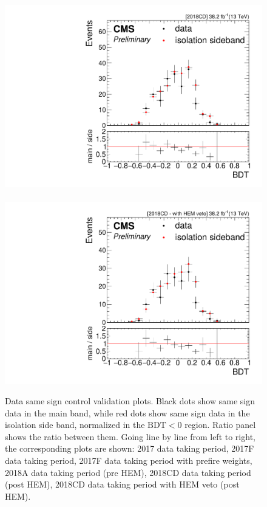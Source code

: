 \begin{figure}[!htb]
\includegraphics[width=0.48\linewidth]{plots/dilepton_muons_data_isocr_no_retag_CorrJetNoMultIso10_06_invmass_same_sign_2018CD/none_dilepBDTCorrJetNoMultIso10Dr0.6.pdf} \,
\includegraphics[width=0.48\linewidth]{plots/dilepton_muons_data_isocr_no_retag_CorrJetNoMultIso10_06_invmass_same_sign_2018CD_hem_veto/hem_ejm_dilepBDTCorrJetNoMultIso10Dr0.6.pdf} \\

\caption[Data same sign control validation plots]{Data same sign control validation plots. Black dots show same sign data in the main band, while red dots show same sign data in the isolation side band, normalized in the $\text{BDT}<0$ region. Ratio panel shows the ratio between them. Going line by line from left to right, the corresponding plots are shown: 2017 data taking period, 2017F data taking period, 2017F data taking period with prefire weights, 2018A data taking period (pre HEM), 2018CD data taking period (post HEM), 2018CD data taking period with HEM veto (post HEM).}
\label{fig:same-sign-validation-plots}
\end{figure}
